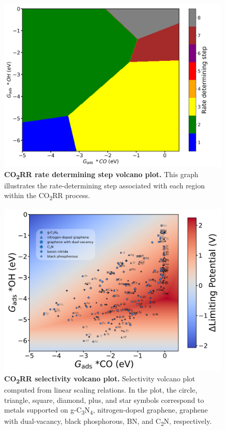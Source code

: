 \begin{figure}[htbp]
  \centering
  \includegraphics[width=\textwidth]{supp_fig11_rds_volcano.png}
  \caption{\textbf{CO\textsubscript{2}RR rate determining step volcano plot.}
  This graph illustrates the rate-determining step associated with each region within the CO\textsubscript{2}RR process.}
  \label{supp_fig11:rds_volcano}
\end{figure}

\begin{figure}[htbp]
  \centering
  \includegraphics[width=\textwidth]{supp_fig12_sel_volc.png}
  \caption{\textbf{CO\textsubscript{2}RR selectivity volcano plot.}
  Selectivity volcano plot computed from linear scaling relations.
  In the plot, the circle, triangle, square, diamond, plus, and star symbols correspond to
  metals supported on g-C\textsubscript{3}N\textsubscript{4}, nitrogen-doped graphene, graphene with dual-vacancy,
  black phosphorous, BN, and C\textsubscript{2}N, respectively.}
  \label{supp_fig12:sel_volc}
\end{figure}

